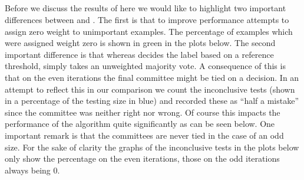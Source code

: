  \subsection{\NHB}
 \label{subsec:NHPracPerf}
Before we discuss the results of \NHB here we would like to highlight two important differences between \NHB and \adaB. The first is that to improve performance \NHB attempts to assign zero weight to unimportant examples. The percentage of examples which were assigned weight zero is shown in green in the plots below. The second important difference is that whereas \adaB decides the label based on a reference threshold, \NHB simply takes an unweighted majority vote. A consequence of this is that on the even iterations the final committee might be tied on a decision. In an attempt to reflect this in our comparison we count the inconclusive tests (shown in a percentage of the testing size in blue) and recorded these as ``half a mistake'' since the committee was neither right nor wrong. Of course this impacts the performance of the algorithm quite significantly as can be seen below.  One important remark is that the committees are never tied in the case of an odd size. For the sake of clarity the graphs of the inconclusive tests in the plots below only show the percentage on the even iterations, those on the odd iterations always being 0.



